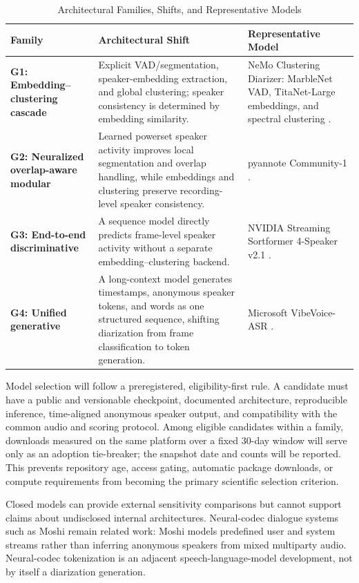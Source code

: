\documentclass[conference,onecolumn]{IEEEtran}
\begin{document}
\begin{table}[t]
\caption{Architectural Families, Shifts, and Representative Models}
\label{tab:models}
\centering
\footnotesize
\setlength{\tabcolsep}{3pt}
\begin{tabularx}{\columnwidth}{@{}p{}p{}Y@{}}
\toprule
\textbf{Family} & \textbf{Architectural Shift} & \textbf{Representative Model} \\
\midrule
\textbf{G1: Embedding--clustering cascade} & Explicit VAD/segmentation,
speaker-embedding extraction, and global clustering; speaker consistency is
determined by embedding similarity. & NeMo Clustering Diarizer: MarbleNet VAD,
TitaNet-Large embeddings, and spectral clustering \cite{koluguri2022titanet}. \\
\textbf{G2: Neuralized overlap-aware modular} & Learned powerset speaker
activity improves local segmentation and overlap handling, while embeddings
and clustering preserve recording-level speaker consistency. & pyannote
Community-1 \cite{plaquet2023powerset,bredin2023pyannote}. \\
\textbf{G3: End-to-end discriminative} & A sequence model directly predicts
frame-level speaker activity without a separate embedding--clustering backend.
& NVIDIA Streaming Sortformer 4-Speaker v2.1 \cite{park2024sortformer}. \\
\textbf{G4: Unified generative} & A long-context model generates timestamps,
anonymous speaker tokens, and words as one structured sequence, shifting
diarization from frame classification to token generation. & Microsoft
VibeVoice-ASR \cite{peng2026vibevoice}. \\
\bottomrule
\end{tabularx}
\end{table}

Model selection will follow a preregistered, eligibility-first rule. A candidate
must have a public and versionable checkpoint, documented architecture,
reproducible inference, time-aligned anonymous speaker output, and compatibility
with the common audio and scoring protocol. Among eligible candidates within a
family, downloads measured on the same platform over a fixed 30-day window will
serve only as an adoption tie-breaker; the snapshot date and counts will be
reported. This prevents repository age, access gating, automatic package
downloads, or compute requirements from becoming the primary scientific
selection criterion.

Closed models can provide external sensitivity comparisons but cannot support
claims about undisclosed internal architectures. Neural-codec dialogue systems
such as Moshi \cite{defossez2024moshi} remain related work: Moshi models
predefined user and system streams rather than inferring anonymous speakers
from mixed multiparty audio. Neural-codec tokenization is an adjacent
speech-language-model development, not by itself a diarization generation.
\end{document}
